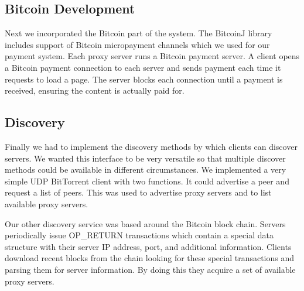 \subsection{Bitcoin Development}
Next we incorporated the Bitcoin part of the system. The BitcoinJ library includes support of Bitcoin micropayment channels which we used for our payment system. Each proxy server runs a Bitcoin payment server. A client opens a Bitcoin payment connection to each server and sends payment each time it requests to load a page. The server blocks each connection until a payment is received, ensuring the content is actually paid for.

\subsection{Discovery}
Finally we had to implement the discovery methods by which clients can discover servers. We wanted this interface to be very versatile so that multiple discover methods could be available in different circumstances. We implemented a very simple UDP BitTorrent client with two functions. It could advertise a peer and request a list of peers. This was used to advertise proxy servers and to list available proxy servers.

Our other discovery service was based around the Bitcoin block chain. Servers periodically issue OP\_RETURN transactions which contain a special data structure with their server IP address, port, and additional information. Clients download recent blocks from the chain looking for these special transactions and parsing them for server information. By doing this they acquire a set of available proxy servers.